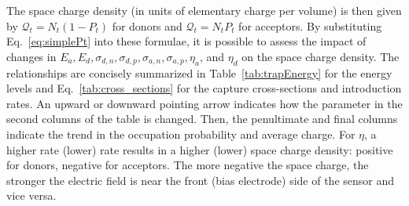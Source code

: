 






The space charge density (in units of elementary charge per volume) is then given by $\mathcal{Q}_t = N_t(1-P_t)$ for donors and $\mathcal{Q}_t = N_tP_t$ for acceptors.  By substituting Eq.~\ref{eq:simplePt} into these formulae, it is possible to assess the impact of changes in $E_a,E_d,\sigma_{d,n},\sigma_{d,p},\sigma_{a,n},\sigma_{a,p},\eta_a$, and $\eta_d$ on the space charge density.  The relationships are concisely summarized in Table~\ref{tab:trapEnergy} for the energy levels and Eq.~\ref{tab:cross_sections} for the capture cross-sections and introduction rates.  An upward or downward pointing arrow indicates how the parameter in the second columns of the table is changed.  Then, the penultimate and final columns indicate the trend in the occupation probability and average charge.  For $\eta$, a higher rate (lower) rate results in a higher (lower) space charge density: positive for donors, negative for acceptors.  The more negative the space charge, the stronger the electric field is near the front (bias electrode) side of the sensor and vice versa.


